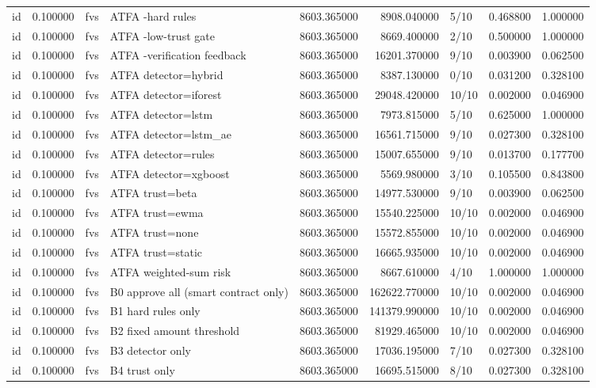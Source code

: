 \begin{tabular}{lrllrrlrr}
id & 0.100000 & fvs & ATFA -hard rules & 8603.365000 & 8908.040000 & 5/10 & 0.468800 & 1.000000 \\
id & 0.100000 & fvs & ATFA -low-trust gate & 8603.365000 & 8669.400000 & 2/10 & 0.500000 & 1.000000 \\
id & 0.100000 & fvs & ATFA -verification feedback & 8603.365000 & 16201.370000 & 9/10 & 0.003900 & 0.062500 \\
id & 0.100000 & fvs & ATFA detector=hybrid & 8603.365000 & 8387.130000 & 0/10 & 0.031200 & 0.328100 \\
id & 0.100000 & fvs & ATFA detector=iforest & 8603.365000 & 29048.420000 & 10/10 & 0.002000 & 0.046900 \\
id & 0.100000 & fvs & ATFA detector=lstm & 8603.365000 & 7973.815000 & 5/10 & 0.625000 & 1.000000 \\
id & 0.100000 & fvs & ATFA detector=lstm\_ae & 8603.365000 & 16561.715000 & 9/10 & 0.027300 & 0.328100 \\
id & 0.100000 & fvs & ATFA detector=rules & 8603.365000 & 15007.655000 & 9/10 & 0.013700 & 0.177700 \\
id & 0.100000 & fvs & ATFA detector=xgboost & 8603.365000 & 5569.980000 & 3/10 & 0.105500 & 0.843800 \\
id & 0.100000 & fvs & ATFA trust=beta & 8603.365000 & 14977.530000 & 9/10 & 0.003900 & 0.062500 \\
id & 0.100000 & fvs & ATFA trust=ewma & 8603.365000 & 15540.225000 & 10/10 & 0.002000 & 0.046900 \\
id & 0.100000 & fvs & ATFA trust=none & 8603.365000 & 15572.855000 & 10/10 & 0.002000 & 0.046900 \\
id & 0.100000 & fvs & ATFA trust=static & 8603.365000 & 16665.935000 & 10/10 & 0.002000 & 0.046900 \\
id & 0.100000 & fvs & ATFA weighted-sum risk & 8603.365000 & 8667.610000 & 4/10 & 1.000000 & 1.000000 \\
id & 0.100000 & fvs & B0 approve all (smart contract only) & 8603.365000 & 162622.770000 & 10/10 & 0.002000 & 0.046900 \\
id & 0.100000 & fvs & B1 hard rules only & 8603.365000 & 141379.990000 & 10/10 & 0.002000 & 0.046900 \\
id & 0.100000 & fvs & B2 fixed amount threshold & 8603.365000 & 81929.465000 & 10/10 & 0.002000 & 0.046900 \\
id & 0.100000 & fvs & B3 detector only & 8603.365000 & 17036.195000 & 7/10 & 0.027300 & 0.328100 \\
id & 0.100000 & fvs & B4 trust only & 8603.365000 & 16695.515000 & 8/10 & 0.027300 & 0.328100 \\

\end{tabular}

